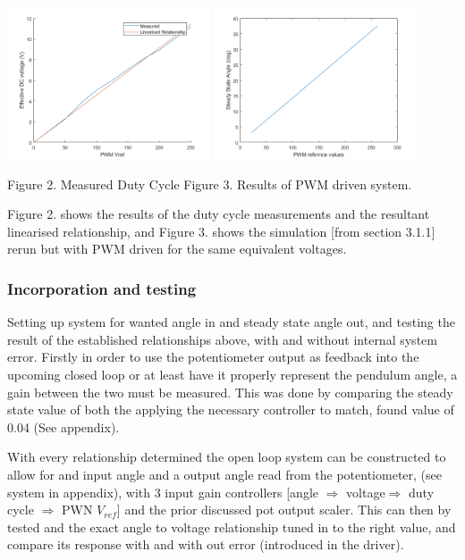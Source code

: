\documentclass[a4paper,11pt]{article}
\begin{document}
{\centering\includegraphics[width=0.45\textwidth]{inc/PWN_effDC.png}
\includegraphics[width=0.45\textwidth]{inc/angle_v_pwm.png}\\}
\begin{center}
        Figure 2. Measured Duty Cycle \hspace{16mm} Figure 3. Results of PWM driven system.
\end{center}

Figure 2. shows the results of the duty cycle measurements and the resultant linearised relationship, and Figure 3. shows the simulation [from section 3.1.1] rerun but with PWM driven for the same equivalent voltages. 

\subsubsection{Incorporation and testing}
Setting up system for wanted angle in and steady state angle out, and testing the result of the established relationships above, with and without internal system error. Firstly in order to use the potentiometer output as feedback into the upcoming closed loop or at least have it properly represent the pendulum angle, a gain between the two must be measured. This was done by comparing the steady state value of both the applying the necessary controller to match, found value of 0.04 (See appendix).

With every relationship determined the open loop system can be constructed to allow for and input angle and a output angle read from the potentiometer, (see system in appendix), with 3 input gain controllers [angle $\Rightarrow$ voltage$\Rightarrow$ duty cycle $\Rightarrow$ PWN $V_{ref}$] and the prior discussed pot output scaler. This can then by tested and the exact angle to voltage relationship tuned in to the right value, and compare its response with and with out error (introduced in the driver).
\end{document}
